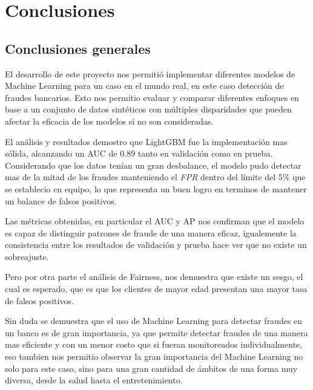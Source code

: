 \documentclass[runningheads]{llncs}
\begin{document}
\section{Conclusiones}

\subsection{Conclusiones generales}

El desarrollo de este proyecto nos permitió implementar diferentes modelos de Machine Learning para un caso en el mundo real, en este caso detección de fraudes bancarios. 
Esto nos permitio evaluar y comparar diferentes enfoques en base a un conjunto de datos sintéticos con múltiples disparidades que pueden afectar la eficacia de los modelos si no son consideradas. 
    \vspace{0.3cm}


El análisis y resultados demostro que LightGBM fue la implementación mas sólida, alcanzando un AUC de 0.89 tanto en validación como en prueba.
Considerando que los datos tenían un gran desbalance, el modelo pudo detectar mas de la mitad de los fraudes manteniendo el  \textit{FPR} dentro del límite del 5\% que se establecio en equipo, lo que representa un buen logro en terminos de mantener un balance de falsos positivos. 

Las métricas obtenidas, en particular el AUC y AP nos confirman que el modelo es capaz de distinguir patrones de fraude de una manera eficaz, igualemente la consistencia entre los resultados de validación y prueba hace ver que no existe un sobreajuste.
    \vspace{0.3cm}


Pero por otra parte el análisis de Fairness, nos demuestra que existe un sesgo, el cual es esperado, que es que los clientes de mayor edad presentan una mayor tasa de falsos positivos.
    \vspace{0.3cm}


Sin duda se demuestra que el uso de Machine Learning para detectar fraudes en un banco es de gran importancia, ya que permite detectar fraudes de una manera mas eficiente y con un menor costo que si fueran monitoreados individualmente, eso tambien nos permitio observar la gran importancia del Machine Learning no solo para este caso, sino para una gran cantidad de ámbitos de una forma muy diversa, desde la salud hasta el entretenimiento.
    \vspace{0.3cm}
\end{document}
